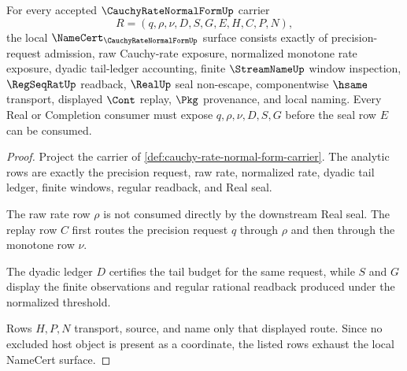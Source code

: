 \begin{theorem}
\label{thm:cauchy-rate-normal-form-obligations}
For every accepted $\CauchyRateNormalFormUp$ carrier
$$
R=(q,\rho,\nu,D,S,G,E,H,C,P,N),
$$
the local $\NameCert_{\CauchyRateNormalFormUp}$ surface consists exactly of precision-request admission, raw Cauchy-rate exposure, normalized monotone rate exposure, dyadic tail-ledger accounting, finite $\StreamNameUp$ window inspection, $\RegSeqRatUp$ readback, $\RealUp$ seal non-escape, componentwise $\hsame$ transport, displayed $\Cont$ replay, $\Pkg$ provenance, and local naming. Every Real or Completion consumer must expose $q,\rho,\nu,D,S,G$ before the seal row $E$ can be consumed.
\end{theorem}
\begin{proof}
Project the carrier of \autoref{def:cauchy-rate-normal-form-carrier}. The analytic rows are exactly the precision request, raw rate, normalized rate, dyadic tail ledger, finite windows, regular readback, and Real seal.

The raw rate row $\rho$ is not consumed directly by the downstream Real seal. The replay row $C$ first routes the precision request $q$ through $\rho$ and then through the monotone row $\nu$.

The dyadic ledger $D$ certifies the tail budget for the same request, while $S$ and $G$ display the finite observations and regular rational readback produced under the normalized threshold.

Rows $H,P,N$ transport, source, and name only that displayed route. Since no excluded host object is present as a coordinate, the listed rows exhaust the local NameCert surface.
\end{proof}

